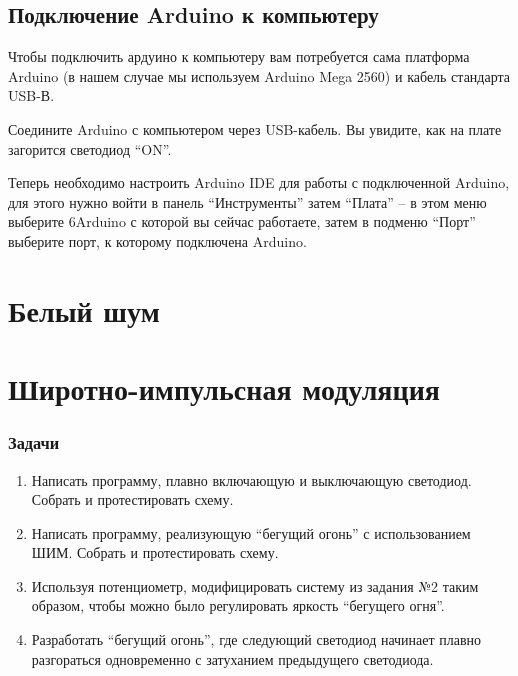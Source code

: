 \documentclass[a4paper,twoside]{book}
\begin{document}
\section{Подключение Arduino к компьютеру}
Чтобы подключить ардуино к компьютеру вам потребуется сама платформа Arduino (в
нашем случае мы используем Arduino Mega 2560) и кабель стандарта USB-В.

Соедините Arduino с компьютером через USB-кабель. Вы увидите, как на плате
загорится светодиод ``ON''.

Теперь необходимо настроить Arduino IDE для работы с подключенной Arduino, для
этого нужно войти в панель ``Инструменты'' затем ``Плата'' -- в этом меню
выберите 6Arduino с которой вы сейчас работаете, затем в подменю ``Порт''
выберите порт, к которому подключена Arduino.

\newpage








\chapter{Белый шум}







\chapter{Широтно-импульсная модуляция}






\subsection{Задачи}

\begin{enumerate}
\item Написать программу, плавно включающую и выключающую светодиод. Собрать и
  протестировать схему. 
\item Написать программу, реализующую ``бегущий огонь'' с использованием ШИМ.
  Собрать и протестировать схему.
\item Используя потенциометр, модифицировать систему из задания №2 таким
  образом, чтобы можно было регулировать яркость ``бегущего огня''.
\item Разработать ``бегущий огонь'', где следующий светодиод начинает плавно
  разгораться одновременно с затуханием предыдущего светодиода.
\end{enumerate}
\end{document}
